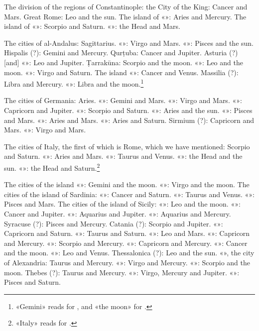 \documentclass[11pt]{article}
\newcommand{\Fol}[1]{\marginpar{\footnotesize\color{gray}f.\,#1}}
\begin{document}
\par The division of the regions of Constantinople: the City of the King: Cancer and Mars. Great Rome: Leo and the sun. The island of «»: Aries and Mercury. The island of «»: Scorpio and Saturn. «»: the Head and Mars.\par
\par The cities of al-Andalus: Sagittarius. «»: Virgo and Mars. «»: Pisces and the sun. Hispalis (?): Gemini and Mercury. Qurṭuba: Cancer and Jupiter. Asturia (?) [and] «»: Leo and Jupiter. Ṭarrakūna: Scorpio and the moon. «»: Leo and the moon. «»: Virgo and Saturn. The island «»: Cancer and Venus. Massilia (?): Libra and Mercury. «»: Libra and the moon.\footnote{«Gemini» reads  for , and «the moon»  for .}\par
\par \Fol{26r}The cities of Germania: Aries. «»: Gemini and Mars. «»: Virgo and Mars. «»: Capricorn and Jupiter. «»: Scorpio and Saturn. «»: Aries and the sun. «»: Pisces and Mars. «»: Aries and Mars. «»: Aries and Saturn. Sirmium (?): Capricorn and Mars. «»: Virgo and Mars.\par
\par The cities of Italy, the first of which is Rome, which we have mentioned: Scorpio and Saturn. «»: Aries and Mars. «»: Taurus and Venus. «»: the Head and the sun. «»: the Head and Saturn.\footnote{«Italy» reads  for .}\par
\par The cities of the island «»: Gemini and the moon. «»: Virgo and the moon. The cities of the island of Sardinia: «»: Cancer and Saturn. «»: Taurus and Venus. «»: Pisces and Mars. The cities of the island of Sicily: «»: Leo and the moon. «»: Cancer and Jupiter. «»: Aquarius and Jupiter. «»: Aquarius and Mercury. Syracuse (?): Pisces and Mercury. Catania (?): Scorpio and Jupiter. «»: Capricorn and Saturn. «»: Taurus and Saturn. «»: Leo and Mars. «»: Capricorn and Mercury. «»: Scorpio and Mercury. «»: Capricorn and Mercury. «»: Cancer and the moon. «»: Leo and Venus. Thessalonica (?): Leo and the sun. «», the city of Alexandria: Taurus and Mercury. «»: Virgo and Mercury. «»: Scorpio and the moon. Thebes (?): Taurus and Mercury. «»: Virgo, Mercury and Jupiter. «»: Pisces and Saturn.\par
\end{document}
